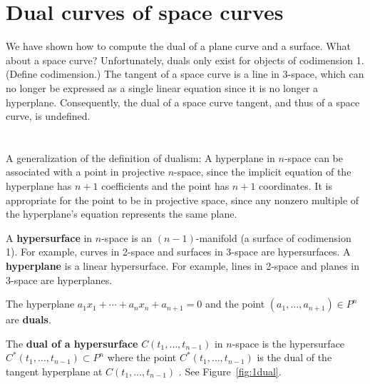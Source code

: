 \documentclass[11pt]{article}
\begin{document}
\section{Dual curves of space curves}

We have shown how to compute the dual of a plane curve and a surface.
What about a space curve?
Unfortunately, duals only exist for objects of codimension 1.
(Define codimension.)
The tangent of a space curve is a line in 3-space, which can no longer
be expressed as a single linear equation since it is no longer a hyperplane.
Consequently, the dual of a space curve tangent, and thus of a space curve,
is undefined.

\section{}

A generalization of the definition of dualism:
A hyperplane in $n$-space can be associated with a point in projective 
$n$-space, since the implicit equation of the hyperplane has $n+1$ coefficients 
and the point has $n+1$ coordinates.
It is appropriate for the point to be in projective space,
since any nonzero multiple of the hyperplane's equation represents the same plane.
%
\begin{defn2}
A {\bf hypersurface} in $n$-space is an $(n-1)$-manifold (a surface of codimension 1).
For example, curves in 2-space and surfaces in 3-space are hypersurfaces.
A {\bf hyperplane} is a linear hypersurface.
For example, lines in 2-space and planes in 3-space are hyperplanes.
\end{defn2}
%
\begin{defn2}
The hyperplane $a_1x_1+\cdots+a_nx_n+a_{n+1}=0$ %
and the point $(a_1,\ldots,a_{n+1}) \in P^n$ are {\bf duals}.
\end{defn2}
%
\begin{defn2}
The {\bf dual of a hypersurface} $C(t_1,\ldots,t_{n-1})$ in $n$-space is the
hypersurface \linebreak $C^*(t_1,\ldots,t_{n-1}) \subset P^n$ where the point 
$C^*(t_1,\ldots,t_{n-1})$ is the dual 
of the tangent hyperplane at $C(t_1,\ldots,t_{n-1})$ \cite{hartshorne}. %
See Figure~\ref{fig:1dual}.
\end{defn2}
\end{document}
